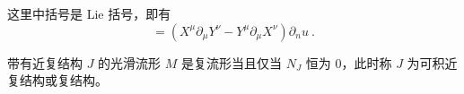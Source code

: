这里中括号是 Lie 括号，即有 
\begin{equation}
[X, Y] = (X^\mu \partial_\mu Y^\nu - Y^\mu \partial_\mu X^\nu) \partial_nu ~.
\end{equation}


\begin{theorem}{}
带有近复结构 $J$ 的光滑流形 $M$ 是复流形当且仅当 $N_J$ 恒为 $0$，此时称 $J$ 为可积近复结构或复结构。
\end{theorem}







